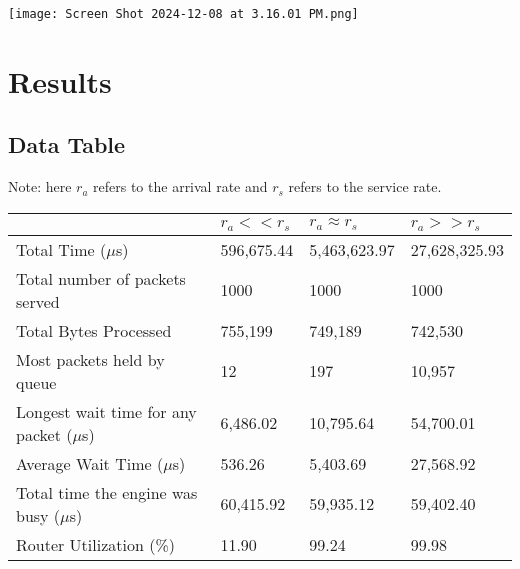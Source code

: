 \documentclass{article}
\begin{document}
\begin{center}
    \texttt{[image: Screen Shot 2024-12-08 at 3.16.01 PM.png]}
\end{center}

\section{Results}

\subsection{Data Table}
Note: here $r_a$ refers to the arrival rate and $r_s$ refers to the service rate.

\begin{center}
\begin{tabular}{l|l|l|l}
                                      & $r_a << r_s$ & $r_a \approx r_s$ & $r_a >> r_s$ \\ \hline
Total Time ($\mu$s)                       & 596,675.44                                     & 5,463,623.97                                     & 27,628,325.93                                        \\
Total number of packets served        & 1000                                           & 1000                                             & 1000                                                 \\
Total Bytes Processed                 & 755,199                                        & 749,189                                          & 742,530                                              \\
Most packets held by queue            & 12                                             & 197                                              & 10,957                                               \\
Longest wait time for any packet ($\mu$s) & 6,486.02                                       & 10,795.64                                        & 54,700.01                                            \\
Average Wait Time ($\mu$s)                & 536.26                                         & 5,403.69                                         & 27,568.92                                            \\
Total time the engine was busy ($\mu$s)   & 60,415.92                                      & 59,935.12                                        & 59,402.40                                            \\
Router Utilization (\%)               & 11.90                                          & 99.24                                            & 99.98                                               
\end{tabular}
\end{center}
\end{document}
